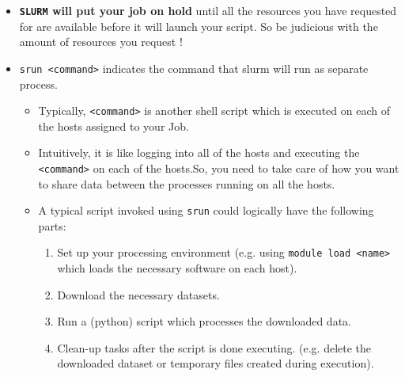 \documentclass[a4paper,11pt]{article}
\begin{document}
\begin{itemize}
\begin{itemize}
     \end{itemize}   
    \item \textbf{\texttt{SLURM} will put your job on hold} until all the resources you have requested for are available before it will launch your script. So be judicious with the amount of resources you request !
    \item  \texttt{srun <command>} indicates the command that slurm will run as separate process.
    \begin{itemize}
    	\item Typically, \texttt{<command>} is another shell script which is executed on each of the hosts assigned to your Job.
    	\item Intuitively, it is like logging into all of the hosts and executing the \texttt{<command>} on each of the hosts.So, you need to take care of how you want to share data between the processes running on all the hosts.  
	    \item A typical script invoked using \texttt{srun} could logically have the following parts:
            \begin{enumerate}
                \item Set up your processing environment (e.g. using \texttt{module load <name>} which loads the necessary software on each host).
                \item Download the necessary datasets. 
                \item Run a (python) script which processes the downloaded data.
                \item Clean-up tasks after the script is done executing. (e.g. delete the downloaded dataset or temporary files created during execution). 
            \end{enumerate}
    \end{itemize}  	
\end{itemize}
\end{document}
